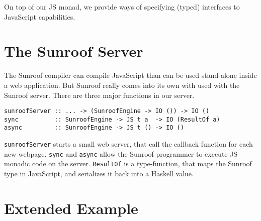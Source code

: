 \documentclass{llncs}
\begin{document}
On top of our JS monad, we provide ways of specifying (typed)
interfaces to JavaScript capabilities.

\section{The Sunroof Server}

The Sunroof compiler can compile JavaScript than can be used
stand-alone inside a web application. But Sunroof really comes
into its own with used with the Sunroof server. There
are three major functions in our server.

\begin{verbatim}
sunroofServer :: ... -> (SunroofEngine -> IO ()) -> IO ()
sync          :: SunroofEngine -> JS t a  -> IO (ResultOf a)
async         :: SunroofEngine -> JS t () -> IO ()
\end{verbatim}        

\verb|sunroofServer| starts a small web server,
that call the callback function for each new webpage.
\verb|sync| and \verb|async| allow the Sunroof programmer
to execute JS-monadic code on the server.
\verb|ResultOf| is a type-function, that maps the 
Sunroof type in JavaScript, and serializes it
back into a Haskell value.

\section{Extended Example}


%
%


\end{document}
